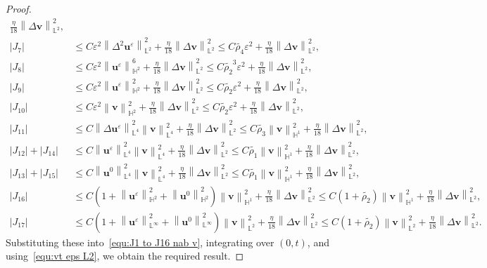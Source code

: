 \documentclass[11pt, reqno]{amsart}
\theoremstyle{definition}
\numberwithin{equation}{section}
\newcommand{\bff}{\boldsymbol}
\newcommand{\bb}{\mathbb}
\newcommand{\norm}[2]{\left\|{#1}\right\|_{#2}}
\newcommand{\abs}[1]{\left|{#1}\right|}
\begin{document}
\begin{proof}
\begin{align*}
    \frac{\eta}{18} \norm{\Delta \bff{v}}{\bb{L}^2}^2,
    \\
    \abs{J_7}
    &\leq
    C\varepsilon^2  \norm{\Delta^2 \bff{u}^\varepsilon}{\bb{L}^2}^2
    +
    \frac{\eta}{18} \norm{\Delta \bff{v}}{\bb{L}^2}^2
    \leq
    C\widetilde{\rho_4} \varepsilon^2
    +
    \frac{\eta}{18} \norm{\Delta \bff{v}}{\bb{L}^2}^2,
    \\
    \abs{J_8}
    &\leq
    C\varepsilon^2 \norm{\bff{u}^\varepsilon}{\bb{H}^2}^6
    +
    \frac{\eta}{18} \norm{\Delta \bff{v}}{\bb{L}^2}^2
    \leq
    C\widetilde{\rho_2}^3 \varepsilon^2
    +
    \frac{\eta}{18} \norm{\Delta \bff{v}}{\bb{L}^2}^2,
    \\
    \abs{J_9}
    &\leq
    C\varepsilon^2 \norm{\bff{u}^\varepsilon}{\bb{H}^2}^2
    +
    \frac{\eta}{18} \norm{\Delta \bff{v}}{\bb{L}^2}^2
    \leq
    C\widetilde{\rho_2} \varepsilon^2
    +
    \frac{\eta}{18} \norm{\Delta \bff{v}}{\bb{L}^2}^2,
    \\
    \abs{J_{10}}
    &\leq
    C\varepsilon^2 \norm{\bff{v}}{\bb{H}^2}^2
    +
    \frac{\eta}{18} \norm{\Delta \bff{v}}{\bb{L}^2}^2
    \leq
    C\widetilde{\rho_2} \varepsilon^2
    +
    \frac{\eta}{18} \norm{\Delta \bff{v}}{\bb{L}^2}^2,
    \\
    \abs{J_{11}}
    &\leq
    C \norm{\Delta \bff{u}^\varepsilon}{\bb{L}^4}^2 \norm{\bff{v}}{\bb{L}^4}^2
    +
    \frac{\eta}{18} \norm{\Delta \bff{v}}{\bb{L}^2}^2
    \leq
    C\widetilde{\rho_3} \norm{\bff{v}}{\bb{H}^1}^2 
    +
    \frac{\eta}{18} \norm{\Delta \bff{v}}{\bb{L}^2}^2,
    \\
    \abs{J_{12}} + \abs{J_{14}}
    &\leq
    C \norm{\bff{u}^\varepsilon}{\bb{L}^4}^2 \norm{\bff{v}}{\bb{L}^4}^2
    +
    \frac{\eta}{18} \norm{\Delta \bff{v}}{\bb{L}^2}^2
    \leq
    C \widetilde{\rho_1} \norm{\bff{v}}{\bb{H}^1}^2
    +
    \frac{\eta}{18} \norm{\Delta \bff{v}}{\bb{L}^2}^2,
    \\
    \abs{J_{13}} + \abs{J_{15}}
    &\leq
    C\norm{\bff{u}^0}{\bb{L}^4}^2 \norm{\bff{v}}{\bb{L}^4}^2
    +
    \frac{\eta}{18} \norm{\Delta \bff{v}}{\bb{L}^2}^2
    \leq
    C \widetilde{\rho_1} \norm{\bff{v}}{\bb{H}^1}^2
    +
    \frac{\eta}{18} \norm{\Delta \bff{v}}{\bb{L}^2}^2,
    \\
    \abs{J_{16}}
    &\leq
    C\left(1+\norm{\bff{u}^\varepsilon}{\bb{H}^2}^2 + \norm{\bff{u}^0}{\bb{H}^2}^2 \right) \norm{\bff{v}}{\bb{H}^1}^2
    +
    \frac{\eta}{18} \norm{\Delta \bff{v}}{\bb{L}^2}^2
    \leq
    C\left(1+\widetilde{\rho_2} \right) \norm{\bff{v}}{\bb{H}^1}^2
    +
    \frac{\eta}{18} \norm{\Delta \bff{v}}{\bb{L}^2}^2,
    \\
    \abs{J_{17}}
    &\leq
    C\left(1+\norm{\bff{u}^\varepsilon}{\bb{L}^\infty}^2 + \norm{\bff{u}^0}{\bb{L}^\infty}^2 \right) \norm{\bff{v}}{\bb{L}^2}^2
    +
    \frac{\eta}{18} \norm{\Delta \bff{v}}{\bb{L}^2}^2
    \leq
    C\left(1+\widetilde{\rho_2} \right) \norm{\bff{v}}{\bb{L}^2}^2
    +
    \frac{\eta}{18} \norm{\Delta \bff{v}}{\bb{L}^2}^2.
\end{align*}
Substituting these into~\eqref{equ:J1 to J16 nab v}, integrating over $(0,t)$, and using~\eqref{equ:vt eps L2}, we obtain the required result.
\end{proof}







\end{document}
